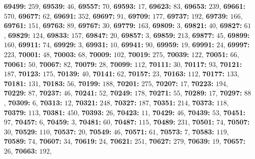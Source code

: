 \textsf{\bfseries 69499:} $259$, \textsf{\bfseries 69539:} $46$, \textsf{\bfseries 69557:} $70$, \textsf{\bfseries 69593:} $17$, \textsf{\bfseries 69623:} $83$, \textsf{\bfseries 69653:} $239$, \textsf{\bfseries 69661:} $570$, \textsf{\bfseries 69677:} $62$, \textsf{\bfseries 69691:} $352$, \textsf{\bfseries 69697:} $91$, \textsf{\bfseries 69709:} $177$, \textsf{\bfseries 69737:} $192$, \textsf{\bfseries 69739:} $166$, \textsf{\bfseries 69761:} $151$, \textsf{\bfseries 69763:} $89$, \textsf{\bfseries 69767:} $30$, \textsf{\bfseries 69779:} $163$, \textsf{\bfseries 69809:} $3$, \textsf{\bfseries 69821:} $40$, \textsf{\bfseries 69827:} $61$, \textsf{\bfseries 69829:} $124$, \textsf{\bfseries 69833:} $157$, \textsf{\bfseries 69847:} $20$, \textsf{\bfseries 69857:} $3$, \textsf{\bfseries 69859:} $213$, \textsf{\bfseries 69877:} $45$, \textsf{\bfseries 69899:} $160$, \textsf{\bfseries 69911:} $74$, \textsf{\bfseries 69929:} $3$, \textsf{\bfseries 69931:} $10$, \textsf{\bfseries 69941:} $90$, \textsf{\bfseries 69959:} $19$, \textsf{\bfseries 69991:} $24$, \textsf{\bfseries 69997:} $223$, \textsf{\bfseries 70001:} $48$, \textsf{\bfseries 70003:} $68$, \textsf{\bfseries 70009:} $102$, \textsf{\bfseries 70019:} $275$, \textsf{\bfseries 70039:} $122$, \textsf{\bfseries 70051:} $66$, \textsf{\bfseries 70061:} $50$, \textsf{\bfseries 70067:} $82$, \textsf{\bfseries 70079:} $28$, \textsf{\bfseries 70099:} $112$, \textsf{\bfseries 70111:} $30$, \textsf{\bfseries 70117:} $93$, \textsf{\bfseries 70121:} $187$, \textsf{\bfseries 70123:} $175$, \textsf{\bfseries 70139:} $40$, \textsf{\bfseries 70141:} $62$, \textsf{\bfseries 70157:} $23$, \textsf{\bfseries 70163:} $112$, \textsf{\bfseries 70177:} $133$, \textsf{\bfseries 70181:} $131$, \textsf{\bfseries 70183:} $56$, \textsf{\bfseries 70199:} $188$, \textsf{\bfseries 70201:} $275$, \textsf{\bfseries 70207:} $17$, \textsf{\bfseries 70223:} $194$, \textsf{\bfseries 70229:} $87$, \textsf{\bfseries 70237:} $46$, \textsf{\bfseries 70241:} $52$, \textsf{\bfseries 70249:} $178$, \textsf{\bfseries 70271:} $55$, \textsf{\bfseries 70289:} $17$, \textsf{\bfseries 70297:} $88$, \textsf{\bfseries 70309:} $6$, \textsf{\bfseries 70313:} $12$, \textsf{\bfseries 70321:} $248$, \textsf{\bfseries 70327:} $187$, \textsf{\bfseries 70351:} $214$, \textsf{\bfseries 70373:} $118$, \textsf{\bfseries 70379:} $113$, \textsf{\bfseries 70381:} $450$, \textsf{\bfseries 70393:} $26$, \textsf{\bfseries 70423:} $11$, \textsf{\bfseries 70429:} $46$, \textsf{\bfseries 70439:} $53$, \textsf{\bfseries 70451:} $97$, \textsf{\bfseries 70457:} $6$, \textsf{\bfseries 70459:} $3$, \textsf{\bfseries 70481:} $60$, \textsf{\bfseries 70487:} $115$, \textsf{\bfseries 70489:} $231$, \textsf{\bfseries 70501:} $74$, \textsf{\bfseries 70507:} $30$, \textsf{\bfseries 70529:} $110$, \textsf{\bfseries 70537:} $20$, \textsf{\bfseries 70549:} $46$, \textsf{\bfseries 70571:} $61$, \textsf{\bfseries 70573:} $7$, \textsf{\bfseries 70583:} $119$, \textsf{\bfseries 70589:} $74$, \textsf{\bfseries 70607:} $34$, \textsf{\bfseries 70619:} $24$, \textsf{\bfseries 70621:} $251$, \textsf{\bfseries 70627:} $279$, \textsf{\bfseries 70639:} $19$, \textsf{\bfseries 70657:} $26$, \textsf{\bfseries 70663:} $192$, 
